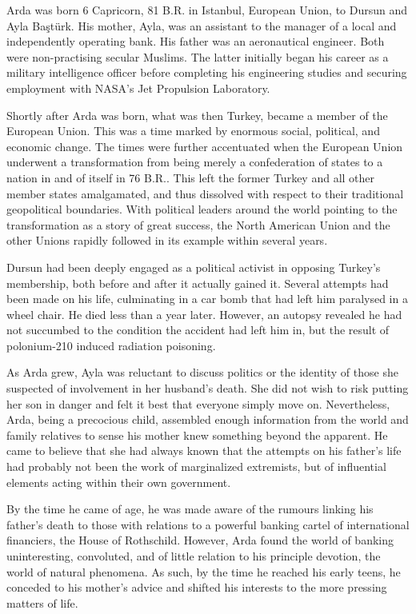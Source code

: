 
Arda was born 6 Capricorn, 81 B.R. in Istanbul, European Union, to Dursun and Ayla Baştürk. His mother, Ayla, was an assistant to the manager of a local and independently operating bank. His father was an aeronautical engineer. Both were non-practising secular Muslims. The latter initially began his career as a military intelligence officer before completing his engineering studies and securing employment with NASA's Jet Propulsion Laboratory. 

Shortly after Arda was born, what was then Turkey, became a member of the European Union. This was a time marked by enormous social, political, and economic change. The times were further accentuated when the European Union underwent a transformation from being merely a confederation of states to a nation in and of itself in 76 B.R.. This left the former Turkey and all other member states amalgamated, and thus dissolved with respect to their traditional geopolitical boundaries. With political leaders around the world pointing to the transformation as a story of great success, the North American Union and the other Unions rapidly followed in its example within several years.

Dursun had been deeply engaged as a political activist in opposing Turkey's membership, both before and after it actually gained it. Several attempts had been made on his life, culminating in a car bomb that had left him paralysed in a wheel chair. He died less than a year later. However, an autopsy revealed he had not succumbed to the condition the accident had left him in, but the result of polonium-210 induced radiation poisoning.

As Arda grew, Ayla was reluctant to discuss politics or the identity of those she suspected of involvement in her husband's death. She did not wish to risk putting her son in danger and felt it best that everyone simply move on. Nevertheless, Arda, being a precocious child, assembled enough information from the world and family relatives to sense his mother knew something beyond the apparent. He came to believe that she had always known that the attempts on his father's life had probably not been the work of marginalized extremists, but of influential elements acting within their own government.

By the time he came of age, he was made aware of the rumours linking his father's death to those with relations to a powerful banking cartel of international financiers, the House of Rothschild. However, Arda found the world of banking uninteresting, convoluted, and of little relation to his principle devotion, the world of natural phenomena. As such, by the time he reached his early teens, he conceded to his mother's advice and shifted his interests to the more pressing matters of life.

